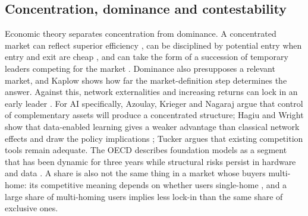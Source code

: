 \documentclass[11pt]{article}
\begin{document}
\subsection{Concentration, dominance and contestability} Economic theory separates concentration from dominance. A concentrated market can reflect superior efficiency \cite{demsetz1973industry}, can be disciplined by potential entry when entry and exit are cheap \cite{baumol1982contestable}, and can take the form of a succession of temporary leaders competing for the market \cite{schumpeter1942capitalism}. Dominance also presupposes a relevant market, and Kaplow \cite{kaplow2010why} shows how far the market-definition step determines the answer. Against this, network externalities and increasing returns can lock in an early leader \cite{katz1985network,arthur1989competing}. For AI specifically, Azoulay, Krieger and Nagaraj \cite{azoulay2025old} argue that control of complementary assets will produce a concentrated structure; Hagiu and Wright show that data-enabled learning gives a weaker advantage than classical network effects \cite{hagiu2023data} and draw the policy implications \cite{hagiu2025ai}; Tucker \cite{tucker2024competition} argues that existing competition tools remain adequate. The OECD describes foundation models as a segment that has been dynamic for three years while structural risks persist in hardware and data \cite{oecd2026markets}. A share is also not the same thing in a market whose buyers multi-home: its competitive meaning depends on whether users single-home \cite{rochet2003platform,armstrong2006competition}, and a large share of multi-homing users implies less lock-in than the same share of exclusive ones.
\end{document}
